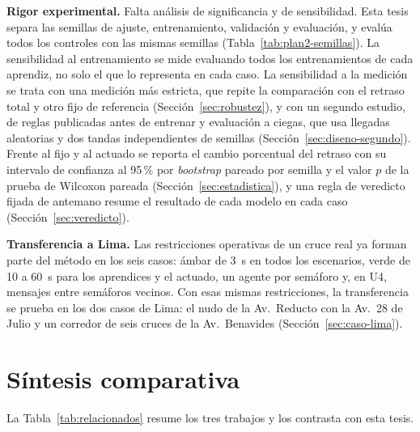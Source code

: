 \noindent\textbf{Rigor experimental.} Falta análisis de significancia y de sensibilidad. Esta tesis separa las semillas de ajuste, entrenamiento, validación y evaluación, y evalúa todos los controles con las mismas semillas (Tabla~\ref{tab:plan2-semillas}). La sensibilidad al entrenamiento se mide evaluando todos los entrenamientos de cada aprendiz, no solo el que lo representa en cada caso. La sensibilidad a la medición se trata con una medición más estricta, que repite la comparación con el retraso total y otro fijo de referencia (Sección~\ref{sec:robustez}), y con un segundo estudio, de reglas publicadas antes de entrenar y evaluación a ciegas, que usa llegadas aleatorias y dos tandas independientes de semillas (Sección~\ref{sec:diseno-segundo}). Frente al fijo y al actuado se reporta el cambio porcentual del retraso con su intervalo de confianza al 95\,\% por \textit{bootstrap} pareado por semilla y el valor $p$ de la prueba de Wilcoxon pareada (Sección~\ref{sec:estadistica}), y una regla de veredicto fijada de antemano resume el resultado de cada modelo en cada caso (Sección~\ref{sec:veredicto}).

\noindent\textbf{Transferencia a Lima.} Las restricciones operativas de un cruce real ya forman parte del método en los seis casos: ámbar de 3~s en todos los escenarios, verde de 10 a 60~s para los aprendices y el actuado, un agente por semáforo y, en U4, mensajes entre semáforos vecinos. Con esas mismas restricciones, la transferencia se prueba en los dos casos de Lima: el nudo de la Av.~Reducto con la Av.~28 de Julio y un corredor de seis cruces de la Av.~Benavides (Sección~\ref{sec:caso-lima}).

\section{Síntesis comparativa}

La Tabla~\ref{tab:relacionados} resume los tres trabajos y los contrasta con esta tesis.


